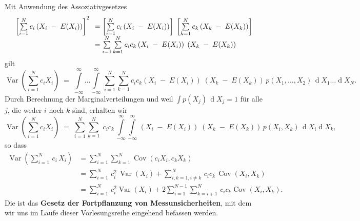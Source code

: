 Mit Anwendung des Assoziativgesetzes
$$
\arraycolsep=3.5pt\def\arraystretch{1.8}
\begin{array}{ll}
\left[ \sum\limits_{i=1}^N c_i \left(X_i \; - \; E(X_i)\right) \right]^2 & =
\left[ \sum\limits_{i=1}^N c_i \left(X_i \; - \; E(X_i)\right) \right] \;
\left[ \sum\limits_{k=1}^N c_k \left(X_k \; - \; E(X_k)\right) \right] \\
& = \sum\limits_{i=1}^N \sum\limits_{k=1}^N c_i c_k  \left(X_i \; - \; E(X_i)\right) \;
\left(X_k \; - \; E(X_k)\right) \\
\end{array}
$$
gilt
\begin{equation}
\operatorname {Var}\left(\sum _{{i=1}}^{N}c_i X_{i}\right) \; = \;
\int\limits_{-\infty}^{\infty} \dots \int\limits_{-\infty}^{\infty}
\, \sum_{i=1}^N \sum_{k=1}^N c_i c_k  \left(X_i \; - \; E(X_i)\right) \;
\left(X_k \; - \; E(X_k)\right) \, p(X_1, \dots, X_2)
\, \operatorname{d}X_1 \dots \operatorname{d}X_N .
\end{equation}
Durch Berechnung der Marginalverteilungen und weil $\int p(X_j) \, \operatorname{d}X_j = 1$
für alle $j$, die weder $i$ noch $k$ sind, erhalten wir
\begin{equation}
\operatorname {Var}\left(\sum _{{i=1}}^{N}c_i X_{i}\right) \; = \;
\sum_{i=1}^N \sum_{k=1}^N  \; c_i c_k \, 
\int\limits_{-\infty}^{\infty} \int\limits_{-\infty}^{\infty}
\, \left(X_i \; - \; E(X_i)\right) \;
\left(X_k \; - \; E(X_k)\right) \, p(X_i, X_k)
\, \operatorname{d}X_i \operatorname{d}X_k ,
\end{equation}
so dass
\begin{equation}
{\begin{aligned}\operatorname {Var}\left(\sum _{{i=1}}^{N} \, c_i \, X_{i}\right) & 
	= \sum _{i=1}^{N}\sum _{k=1}^{N}\operatorname {Cov}(c_i X_{i}, c_k X_{k})\\
	& = \sum _{{i=1}}^{N} \, c_i^2 \, \operatorname {Var}(X_{i})+
	\sum _{{i,k=1,i\neq k}}^{N} \, c_i c_k \,  \operatorname {Cov}(X_{i},X_{k})\\
	& = \sum _{{i=1}}^{N} \, c_i^2 \operatorname {Var}(X_{i})+2\sum _{{i=1}}^{{N-1}}
	\sum _{{k=i+1}}^{N} \, c_i c_k \operatorname {Cov}(X_{i},X_{k}).
	\end{aligned}}
\label{univarLinearFortpflanzungKap1}
\end{equation}
Die ist das \textbf{Gesetz der Fortpflanzung von Messunsicherheiten}, mit dem wir uns im Laufe
dieser Vorlesungsreihe eingehend befassen werden.

\newpage

